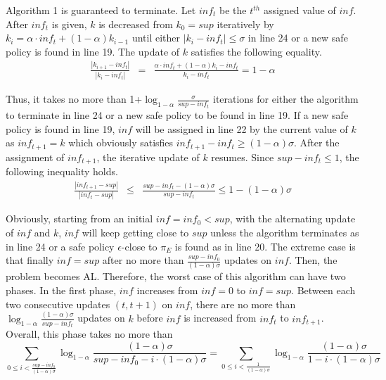 
Algorithm 1 is guaranteed to terminate. Let $inf_t$ be the $t^{th}$ assigned value of $inf$. After $inf_t$ is given, $k$ is decreased from $k_0=sup$ iteratively by $k_{i}=\alpha\cdot inf_t + (1 - \alpha)k_{i-1}$ until either $|k_i-inf_t|\leq \sigma$ in line 24 or a new safe policy is found in line 19. The update of $k$ satisfies the following equality.
\begin{eqnarray}
\frac{|k_{i+1} - inf_t|}{|k_i - inf_t|}&=& \frac{\alpha\cdot inf_t + (1 - \alpha)k_i - inf_t}{k_i - inf_t} =  1-\alpha
\end{eqnarray}

Thus, it takes no more than 1+$\log_{1-\alpha}\frac{\sigma}{sup - inf_t}$ iterations for either the algorithm to terminate in line 24 or a new safe policy to be found in line 19. If a new safe policy is found in line 19, $inf$ will be assigned in line 22 by the current value of $k$ as $inf_{t+1}=k$ which obviously satisfies $inf_{t+1} - inf_t \geq(1-\alpha)\sigma$. After the assignment of $inf_{t+1}$, the iterative update of $k$ resumes. Since $sup-inf_t \leq 1$, the following inequality holds.
\begin{eqnarray}
\frac{|inf_{t+1} - sup|}{|inf_{t} - sup|}&\leq&\frac{sup -inf_{t} - (1-\alpha)\sigma}{sup- inf_{t}}\leq 1 - (1-\alpha)\sigma
\end{eqnarray}

Obviously, starting from an initial $inf=inf_0<sup$, with the alternating update of $inf$ and $k$, $inf$ will keep getting close to $sup$ unless the algorithm terminates as in line 24 or a safe policy {$\epsilon$-close} to $\pi_E$ is found as in line 20. The extreme case is that finally $inf=sup$ after no more than $\frac{sup-inf_0}{(1-\alpha)\sigma}$ updates on $inf$. Then, the problem becomes AL. Therefore, the worst case of this algorithm can have two phases. In the first phase, $inf$ increases from $inf=0$ to $inf=sup$. Between each two consecutive updates $(t, t+1)$ on $inf$, there are no more than $\log_{1-\alpha}\frac{(1-\alpha)\sigma}{sup - inf_t}$ updates on $k$ before $inf$ is increased from $inf_t$ to $inf_{t+1}$. Overall, this phase takes no more than
\begin{equation}
{\underset{0\leq i< \frac{sup-inf_0}{(1-\alpha)\sigma}}{\sum}\log_{1-\alpha} \frac{(1-\alpha)\sigma}{sup-inf_0-i\cdot (1-\alpha)\sigma}} = {\underset{0\leq i< \frac{1}{(1-\alpha)\sigma}}{\sum}\log_{1-\alpha} \frac{(1-\alpha)\sigma}{1-i\cdot (1-\alpha)\sigma}}
\end{equation}

